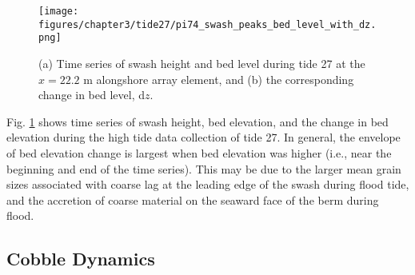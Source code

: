 %

\begin{figure}[tbp] %
  	\texttt{[image: figures/chapter3/tide27/pi74\_swash\_peaks\_bed\_level\_with\_dz.png]}
 	\caption[Time series of swash zone bed level and change in bed level]{(a) Time series of swash height and bed level during tide 27 at the $x=22.2$ m alongshore array element, and (b) the corresponding change in bed level, d$z$.}
 	\label{fig:bed_level_change_pi74}
\end{figure}

Fig. \ref{fig:bed_level_change_pi74} shows time series of swash height, bed elevation, and the change in bed elevation during the high tide data collection of tide 27. In general, the envelope of bed elevation change is largest when bed elevation was higher (i.e., near the beginning and end of the time series). This may be due to the larger mean grain sizes associated with coarse lag at the leading edge of the swash during flood tide, and the accretion of coarse material on the seaward face of the berm during flood.



\subsection{Cobble Dynamics}

